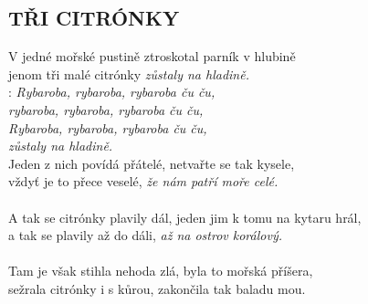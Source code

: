 \begin{flushleft}
	\section*{\Huge TŘI CITRÓNKY}
\end{flushleft}

V jedné mořské pustině ztroskotal parník v hlubině\\
jenom tři malé citrónky \emph{zůstaly na hladině.}\\

\textregistered: \emph{Rybaroba, rybaroba, rybaroba ču ču,\\
rybaroba, rybaroba, rybaroba ču ču,\\
Rybaroba, rybaroba, rybaroba ču ču,\\
zůstaly na hladině.}\\

Jeden z nich povídá přátelé, netvařte se tak kysele,\\
vždyť je to přece veselé, \emph{že nám patří moře celé.}\\
\textregistered\\

A tak se citrónky plavily dál, jeden jim k tomu na kytaru hrál,\\
a tak se plavily až do dáli, \emph{až na ostrov korálový.}\\
\textregistered\\

Tam je však stihla nehoda zlá, byla to mořská příšera,\\
sežrala citrónky i s kůrou, zakončila tak baladu mou.\\
\textregistered

\newpage